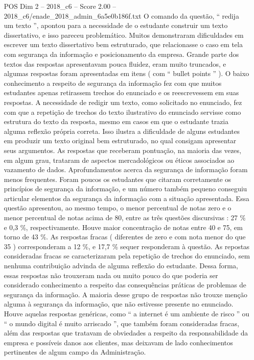 \begin{textsample}{POS Dim 2 – 2018\_c6 – Score 2.00 – 2018\_c6/enade\_2018\_admin\_6a5e0b186f.txt}
O comando da questão, “ redija um texto ”, apontou para a necessidade de o estudante construir um texto dissertativo, e isso pareceu problemático.
Muitos demonstraram dificuldades em escrever um texto dissertativo bem estruturado, que relacionasse o caso em tela com segurança da informação e posicionamento da empresa.
Grande parte dos textos das respostas apresentavam pouca fluidez, eram muito truncados, e algumas respostas foram apresentadas em itens ( com “ bullet points ” ).
O baixo conhecimento a respeito de segurança da informação fez com que muitos estudantes apenas retirassem trechos do enunciado e os reescrevessem em suas respostas.
A necessidade de redigir um texto, como solicitado no enunciado, fez com que a repetição de trechos do texto ilustrativo do enunciado servisse como estrutura do texto da resposta, mesmo em casos em que o estudante trazia alguma reflexão própria correta.
Isso ilustra a dificuldade de alguns estudantes em produzir um texto original bem estruturado, no qual consigam apresentar seus argumentos.
As respostas que receberam pontuação, na maioria das vezes, em algum grau, trataram de aspectos mercadológicos ou éticos associados ao vazamento de dados.
Aprofundamentos acerca da segurança de informação foram menos frequentes.
Foram poucos os estudantes que citaram corretamente os princípios de segurança da informação, e um número também pequeno conseguiu articular elementos da segurança da informação com a situação apresentada.
Essa questão apresentou, ao mesmo tempo, o menor percentual de notas zero e o menor percentual de notas acima de 80, entre as três questões discursivas : 27 \% e 0,3 \%, respectivamente.
Houve maior concentração de notas entre 40 e 75, em torno de 43 \%.
As respostas fracas ( diferentes de zero e com nota menor do que 35 ) corresponderam a 12 \%, e 17,7 \% sequer responderam à questão.
As repostas consideradas fracas se caracterizaram pela repetição de trechos do enunciado, sem nenhuma contribuição advinda de alguma reflexão do estudante.
Dessa forma, essas respostas não trouxeram nada ou muito pouco do que poderia ser considerado conhecimento a respeito das consequências práticas de problemas de segurança da informação.
A maioria desse grupo de respostas não trouxe menção alguma à segurança da informação, que não estivesse presente no enunciado.
Houve aquelas respostas genéricas, como “ a internet é um ambiente de risco ” ou “ o mundo digital é muito arriscado ”, que também foram consideradas fracas, além das respostas que tratavam de obviedades a respeito da responsabilidade da empresa e possíveis danos aos clientes, mas deixavam de lado conhecimentos pertinentes de algum campo da Administração.

\end{textsample}
